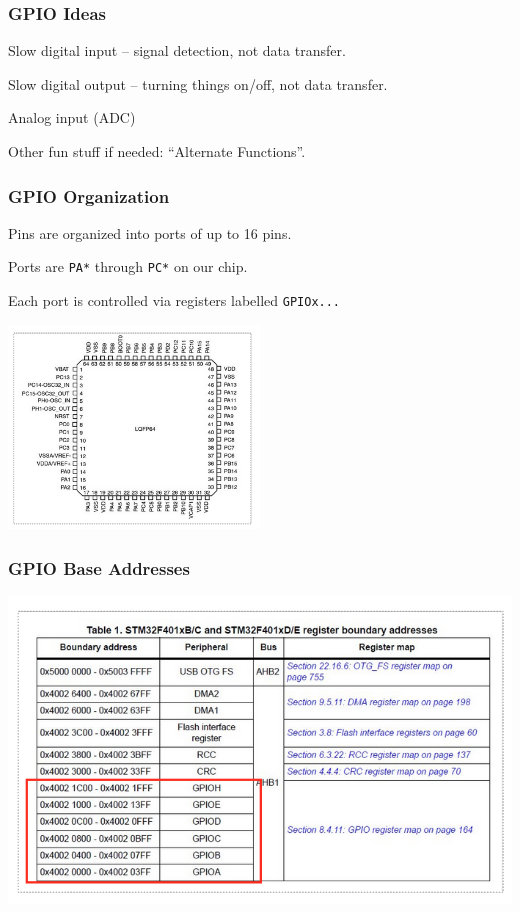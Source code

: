 \begin{frame}
\frametitle{GPIO Ideas}

Slow digital input -- signal detection, not data transfer.

Slow digital output -- turning things on/off, not data transfer.

Analog input (ADC)

Other fun stuff if needed: ``Alternate Functions''.

\end{frame}


\begin{frame}
\frametitle{GPIO Organization}

Pins are organized into \alert{ports} of up to 16 pins.

Ports are \texttt{PA*} through \texttt{PC*} on our chip.

Each port is controlled via registers labelled \texttt{GPIOx...}

\begin{center}
	\includegraphics[width=0.5\textwidth]{images/gpio-chip.png}
\end{center}

\end{frame}


\begin{frame}
\frametitle{GPIO Base Addresses}

\begin{center}
	\includegraphics[width=\textwidth]{images/gpio-base.png}
\end{center}


\end{frame}


